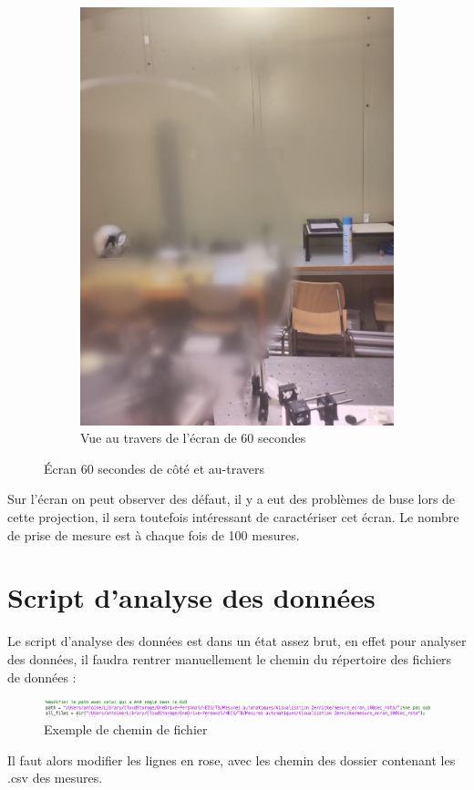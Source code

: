 \begin{figure}[H]
\begin{subfigure}{.5\textwidth}
    \includegraphics[width=1\linewidth]{assets/figures/mesures/60_sec_travers.jpeg}
    \caption{Vue au travers de l'écran de 60 secondes}
  \end{subfigure}
  \caption{Écran 60 secondes de côté et au-travers}
\end{figure}
Sur l'écran on peut observer des défaut, il y a eut des problèmes de buse lors de cette projection, il sera toutefois
intéressant de caractériser cet écran. Le nombre de prise de mesure est à chaque fois de 100 mesures.

\section{Script d'analyse des données}
Le script d'analyse des données est dans un état assez brut, en effet pour analyser des données, il faudra rentrer manuellement
le chemin du répertoire des fichiers de données :
\begin{figure}[H]
  \centering
  \includegraphics[width = 1\textwidth]{assets/figures/mesures/exemple_chemin_fichier.png}
  \caption{Exemple de chemin de fichier}
\end{figure}
Il faut alors modifier les lignes en rose, avec les chemin des dossier contenant les .csv des mesures.

